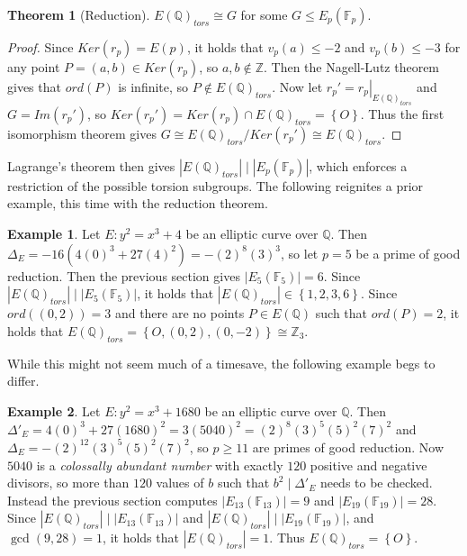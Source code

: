 \documentclass{article}
\newcommand{\F}{\mathbb{F}}
\newcommand{\Z}{\mathbb{Z}}
\newcommand{\Q}{\mathbb{Q}}
\newcommand{\val}[1]{\left. #1 \right\rvert}
\newcommand{\rb}[1]{\left( #1 \right)}
\newcommand{\cb}[1]{\left\{ #1 \right\}}
\newcommand{\abs}[1]{\left\lvert #1 \right\rvert}
\theoremstyle{definition}\newtheorem*{definition}{Definition}
\theoremstyle{definition}\newtheorem*{example}{Example}
\theoremstyle{definition}\newtheorem*{remark}{Remark}
\newtheorem{theorem}[proposition]{Theorem}
\begin{document}
\begin{theorem}[Reduction]
$ E\rb{\Q}_{tors} \cong G $ for some $ G \le E_p\rb{\F_p} $.
\end{theorem}

\begin{proof}
Since $ Ker\rb{r_p} = E\rb{p} $, it holds that $ v_p\rb{a} \le -2 $ and $ v_p\rb{b} \le -3 $ for any point $ P = \rb{a, b} \in Ker\rb{r_p} $, so $ a, b \notin \Z $. Then the Nagell-Lutz theorem gives that $ ord\rb{P} $ is infinite, so $ P \notin E\rb{\Q}_{tors} $. Now let $ r_p' = \val{r_p}_{E\rb{\Q}_{tors}} $ and $ G = Im\rb{r_p'} $, so $ Ker\rb{r_p'} = Ker\rb{r_p} \cap E\rb{\Q}_{tors} = \cb{O} $. Thus the first isomorphism theorem gives $ G \cong E\rb{\Q}_{tors} / Ker\rb{r_p'} \cong E\rb{\Q}_{tors} $.
\end{proof}

Lagrange's theorem then gives $ \abs{E\rb{\Q}_{tors}} \mid \abs{E_p\rb{\F_p}} $, which enforces a restriction of the possible torsion subgroups. The following reignites a prior example, this time with the reduction theorem.

\begin{example}
Let $ E : y^2 = x^3 + 4 $ be an elliptic curve over $ \Q $. Then $ \Delta_E = -16\rb{4\rb{0}^3 + 27\rb{4}^2} = -\rb{2}^8\rb{3}^3 $, so let $ p = 5 $ be a prime of good reduction. Then the previous section gives $ \abs{E_5\rb{\F_5}} = 6 $. Since $ \abs{E\rb{\Q}_{tors}} \mid \abs{E_5\rb{\F_5}} $, it holds that $ \abs{E\rb{\Q}_{tors}} \in \cb{1, 2, 3, 6} $. Since $ ord\rb{\rb{0, 2}} = 3 $ and there are no points $ P \in E\rb{\Q} $ such that $ ord\rb{P} = 2 $, it holds that $ E\rb{\Q}_{tors} = \cb{O, \rb{0, 2}, \rb{0, -2}} \cong \Z_3 $.
\end{example}

While this might not seem much of a timesave, the following example begs to differ.

\begin{example}
Let $ E : y^2 = x^3 + 1680 $ be an elliptic curve over $ \Q $. Then $ \Delta'_E = 4\rb{0}^3 + 27\rb{1680}^2 = 3\rb{5040}^2 = \rb{2}^8\rb{3}^5\rb{5}^2\rb{7}^2 $ and $ \Delta_E = -\rb{2}^12\rb{3}^5\rb{5}^2\rb{7}^2 $, so $ p \ge 11 $ are primes of good reduction. Now $ 5040 $ is a \emph{colossally abundant number} with exactly $ 120 $ positive and negative divisors, so more than $ 120 $ values of $ b $ such that $ b^2 \mid \Delta'_E $ needs to be checked. Instead the previous section computes $ \abs{E_{13}\rb{\F_{13}}} = 9 $ and $ \abs{E_{19}\rb{\F_{19}}} = 28 $. Since $ \abs{E\rb{\Q}_{tors}} \mid \abs{E_{13}\rb{\F_{13}}} $ and $ \abs{E\rb{\Q}_{tors}} \mid \abs{E_{19}\rb{\F_{19}}} $, and $ \gcd\rb{9, 28} = 1 $, it holds that $ \abs{E\rb{\Q}_{tors}} = 1 $. Thus $ E\rb{\Q}_{tors} = \cb{O} $.
\end{example}
\end{document}
